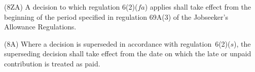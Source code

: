 \documentclass[12pt,a4paper]{article}
\begin{document}
(8ZA) A decision to which regulation 6(2)($fa$) applies shall take effect from the beginning of the period specified in regulation 69A(3) of the Jobseeker’s Allowance Regulations.


\begin{sloppypar}
(8A) Where a decision is superseded in accordance with regulation~6(2)($s$), the superseding decision shall take effect from the date on which the late or unpaid contribution is treated as paid.
\end{sloppypar}

%
%
\end{document}
